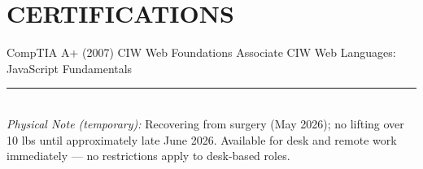 \documentclass[9pt,letterpaper]{extarticle}
\begin{document}
\section*{CERTIFICATIONS}

CompTIA A+ (2007) \textbullet{} CIW Web Foundations Associate \textbullet{} CIW Web Languages: JavaScript Fundamentals

\vspace{8pt}
\noindent\rule{\linewidth}{0.4pt}
\vspace{3pt}
\\[2pt]
{\small\textit{Physical Note (temporary):} Recovering from surgery (May 2026); no lifting over 10 lbs until approximately late June 2026. Available for desk and remote work immediately --- no restrictions apply to desk-based roles.}
\end{document}
